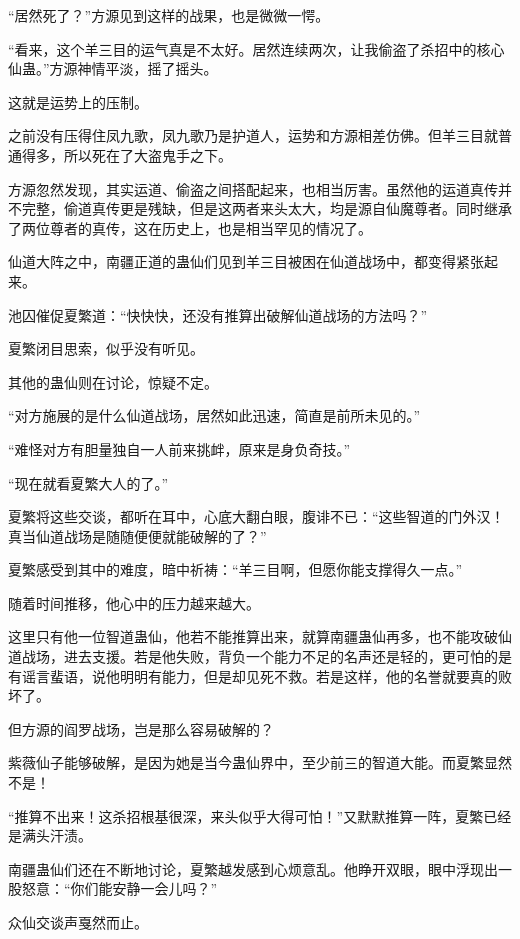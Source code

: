 
\begin{this_body}

“居然死了？”方源见到这样的战果，也是微微一愕。

“看来，这个羊三目的运气真是不太好。居然连续两次，让我偷盗了杀招中的核心仙蛊。”方源神情平淡，摇了摇头。

这就是运势上的压制。

之前没有压得住凤九歌，凤九歌乃是护道人，运势和方源相差仿佛。但羊三目就普通得多，所以死在了大盗鬼手之下。

方源忽然发现，其实运道、偷盗之间搭配起来，也相当厉害。虽然他的运道真传并不完整，偷道真传更是残缺，但是这两者来头太大，均是源自仙魔尊者。同时继承了两位尊者的真传，这在历史上，也是相当罕见的情况了。

仙道大阵之中，南疆正道的蛊仙们见到羊三目被困在仙道战场中，都变得紧张起来。

池囚催促夏繁道：“快快快，还没有推算出破解仙道战场的方法吗？”

夏繁闭目思索，似乎没有听见。

其他的蛊仙则在讨论，惊疑不定。

“对方施展的是什么仙道战场，居然如此迅速，简直是前所未见的。”

“难怪对方有胆量独自一人前来挑衅，原来是身负奇技。”

“现在就看夏繁大人的了。”

夏繁将这些交谈，都听在耳中，心底大翻白眼，腹诽不已：“这些智道的门外汉！真当仙道战场是随随便便就能破解的了？”

夏繁感受到其中的难度，暗中祈祷：“羊三目啊，但愿你能支撑得久一点。”

随着时间推移，他心中的压力越来越大。

这里只有他一位智道蛊仙，他若不能推算出来，就算南疆蛊仙再多，也不能攻破仙道战场，进去支援。若是他失败，背负一个能力不足的名声还是轻的，更可怕的是有谣言蜚语，说他明明有能力，但是却见死不救。若是这样，他的名誉就要真的败坏了。

但方源的阎罗战场，岂是那么容易破解的？

紫薇仙子能够破解，是因为她是当今蛊仙界中，至少前三的智道大能。而夏繁显然不是！

“推算不出来！这杀招根基很深，来头似乎大得可怕！”又默默推算一阵，夏繁已经是满头汗渍。

南疆蛊仙们还在不断地讨论，夏繁越发感到心烦意乱。他睁开双眼，眼中浮现出一股怒意：“你们能安静一会儿吗？”

众仙交谈声戛然而止。


\end{this_body}
